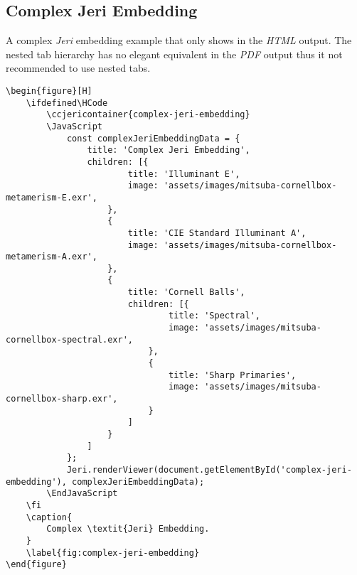 \subsection*{Complex Jeri Embedding}%

A complex \textit{Jeri} embedding example that only shows in the \textit{HTML}
output. The nested tab hierarchy has no elegant equivalent in the \textit{PDF}
output thus it not recommended to use nested tabs.

\begin{lstlisting}[caption={Complex \textit{Jeri} Embedding.}]
\begin{figure}[H]
    \ifdefined\HCode
        \ccjericontainer{complex-jeri-embedding}
        \JavaScript
            const complexJeriEmbeddingData = {
                title: 'Complex Jeri Embedding',
                children: [{
                        title: 'Illuminant E',
                        image: 'assets/images/mitsuba-cornellbox-metamerism-E.exr',
                    },
                    {
                        title: 'CIE Standard Illuminant A',
                        image: 'assets/images/mitsuba-cornellbox-metamerism-A.exr',
                    },
                    {
                        title: 'Cornell Balls',
                        children: [{
                                title: 'Spectral',
                                image: 'assets/images/mitsuba-cornellbox-spectral.exr',
                            },
                            {
                                title: 'Sharp Primaries',
                                image: 'assets/images/mitsuba-cornellbox-sharp.exr',
                            }
                        ]
                    }
                ]
            };
            Jeri.renderViewer(document.getElementById('complex-jeri-embedding'), complexJeriEmbeddingData);
        \EndJavaScript
    \fi
    \caption{
        Complex \textit{Jeri} Embedding.
    }
    \label{fig:complex-jeri-embedding}
\end{figure}
\end{lstlisting}

